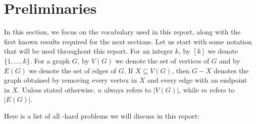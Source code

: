 \section{Preliminaries}
\label{section:preliminaries}

In this section, we focus on the vocabulary used in this report, along with the first known results required for the next sections. Let us start with some notation that will be used throughout this report. For an integer $k$, by $[k]$ we denote $\{1, \dots, k\}$. For a graph $G$, by $V(G)$ we denote the set of vertices of $G$ and by $E(G)$ we denote the set of edges of $G$. If $X \subseteq V(G)$, then $G - X$ denotes the graph obtained by removing every vertex in $X$ and every edge with an endpoint in $X$. Unless stated otherwise, $n$ always refers to $|V(G)|$, while $m$ refers to $|E(G)|$. 

\medskip

Here is a list of all \NP-hard problems we will discuss in this report:

\begin{problem}
\end{problem}

\begin{problem}
\end{problem}

\begin{problem}
\end{problem}


